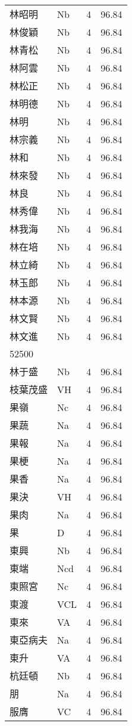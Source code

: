 \documentclass[twocolumn]{book}
\begin{document}
\begin{supertabular}{llrr}
林昭明 & Nb & 4 &  96.84\\
林俊穎 & Nb & 4 &  96.84\\
林青松 & Nb & 4 &  96.84\\
林阿雲 & Nb & 4 &  96.84\\
林松正 & Nb & 4 &  96.84\\
林明德 & Nb & 4 &  96.84\\
林明 & Nb & 4 &  96.84\\
林宗義 & Nb & 4 &  96.84\\
林和 & Nb & 4 &  96.84\\
林來發 & Nb & 4 &  96.84\\
林良 & Nb & 4 &  96.84\\
林秀偉 & Nb & 4 &  96.84\\
林我海 & Nb & 4 &  96.84\\
林在培 & Nb & 4 &  96.84\\
林立綺 & Nb & 4 &  96.84\\
林玉郎 & Nb & 4 &  96.84\\
林本源 & Nb & 4 &  96.84\\
林文賢 & Nb & 4 &  96.84\\
林文進 & Nb & 4 &  96.84\\
52500\\
林于盛 & Nb & 4 &  96.84\\
枝葉茂盛 & VH & 4 &  96.84\\
果嶺 & Nc & 4 &  96.84\\
果蔬 & Na & 4 &  96.84\\
果報 & Na & 4 &  96.84\\
果梗 & Na & 4 &  96.84\\
果香 & Na & 4 &  96.84\\
果決 & VH & 4 &  96.84\\
果肉 & Na & 4 &  96.84\\
果 & D & 4 &  96.84\\
東興 & Nb & 4 &  96.84\\
東端 & Ncd & 4 &  96.84\\
東照宮 & Nc & 4 &  96.84\\
東渡 & VCL & 4 &  96.84\\
東來 & VA & 4 &  96.84\\
東亞病夫 & Na & 4 &  96.84\\
東升 & VA & 4 &  96.84\\
杭廷頓 & Nb & 4 &  96.84\\
朋 & Na & 4 &  96.84\\
服膺 & VC & 4 &  96.84\\

\end{supertabular}
\end{document}
